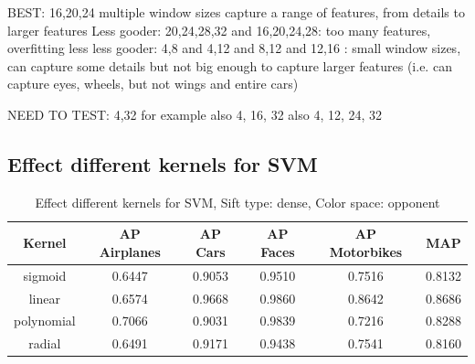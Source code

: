 BEST: 16,20,24
multiple window sizes capture a range of features, from details to larger features
Less gooder: 20,24,28,32 and 16,20,24,28: too many features, overfitting
less less gooder: 4,8 and 4,12 and 8,12 and 12,16 : small window sizes, can capture some details but not big enough to capture larger features (i.e. can capture eyes, wheels, but not wings and entire cars)

NEED TO TEST: 4,32 for example
also 4, 16, 32
also 4, 12, 24, 32

\subsection{Effect different kernels for SVM}

\begin{table}[H]
\begin{tabular}{|c|ccccc|}
\hline
\textbf{Kernel} & \textbf{AP Airplanes} & \textbf{AP Cars} & \textbf{AP Faces} & \textbf{AP Motorbikes} & \textbf{MAP}\\
\hline
sigmoid & 0.6447 & 0.9053 & 0.9510 & 0.7516 & 0.8132\\
linear & 0.6574 & 0.9668 & 0.9860 & 0.8642 & 0.8686 \\
polynomial & 0.7066 & 0.9031 & 0.9839& 0.7216& 0.8288\\
radial & 0.6491 & 0.9171 & 0.9438 & 0.7541 & 0.8160\\
\hline
\end{tabular}
\caption{Effect different kernels for SVM, Sift type: dense, Color space: opponent}
\end{table}
